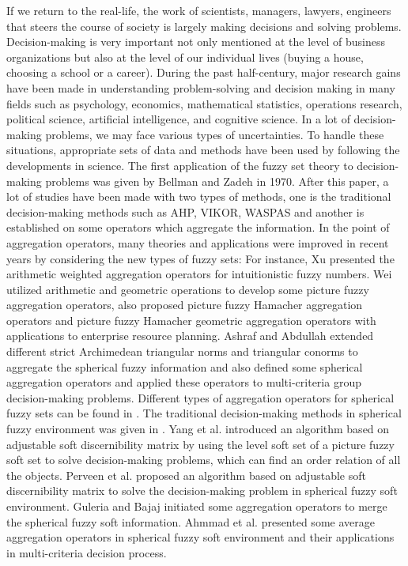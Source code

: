 \documentclass{IJFS}
\begin{document}
If we return to the real-life, the work of scientists, managers, lawyers, engineers that steers the course of society is largely making decisions and solving problems. Decision-making is very
important not only mentioned at the level of business organizations but also at the level of our individual lives (buying a house, choosing a school or a career). During the past half-century, major research gains have been made in understanding problem-solving and decision making in many fields such as
psychology, economics, mathematical statistics, operations research, political science, artificial intelligence, and cognitive science. In a lot of decision-making problems, we may face various types of uncertainties. To handle these situations, appropriate sets of data and methods have been used by following the developments in science. The first application of the fuzzy set theory to decision-making problems was given by Bellman and Zadeh \cite{bel} in 1970. After this paper, a lot of studies have been made with two types of methods, one is the traditional decision-making methods such as AHP, VIKOR, WASPAS and another is established on some operators which aggregate the information. In the point of aggregation operators, many theories and applications were improved in recent years by considering the new types of fuzzy sets: For instance, Xu \cite{xu} presented the arithmetic weighted aggregation operators for intuitionistic fuzzy numbers. Wei \cite{wei, wei1} utilized arithmetic and geometric operations to develop some picture fuzzy aggregation operators, also proposed picture fuzzy Hamacher aggregation operators and picture fuzzy Hamacher geometric aggregation operators with applications to enterprise resource planning.  Ashraf and Abdullah \cite{as2} extended different strict Archimedean triangular norms and triangular conorms to aggregate the spherical fuzzy information and also defined some spherical aggregation operators and applied these operators to multi-criteria group decision-making problems. Different types of aggregation operators for spherical fuzzy sets can be found in \cite{as3, gun, jin, mah, wan}. The traditional decision-making methods in spherical fuzzy environment was given in \cite{ kutlu, kutlu1, kutlu2}.  Yang et al. \cite{yang} introduced an algorithm based on adjustable soft discernibility matrix by using the level soft set of a picture fuzzy soft set to solve decision-making problems, which can find an order relation of all the objects. Perveen et al.  \cite{per} proposed an algorithm based on adjustable soft discernibility matrix to solve the decision-making problem in spherical fuzzy soft environment. Guleria and Bajaj \cite{gul} initiated some aggregation operators to merge the spherical fuzzy soft information. Ahmmad et al. \cite{ah} presented some average aggregation operators in spherical fuzzy soft environment and their applications in multi-criteria decision process.
\end{document}
